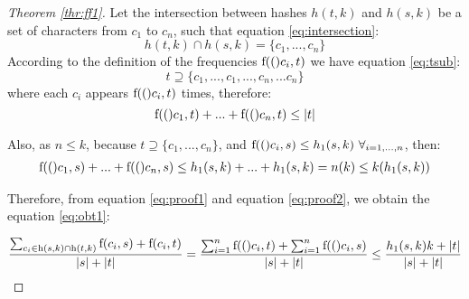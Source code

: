 
\begin{proof}[Theorem \ref{thr:ff1}]
	Let the intersection between hashes $h(t,k)$ and $h(s,k)$ be a set of characters from $c_1$ to $c_n$, such that equation \ref{eq:intersection}: 
	\begin{equation} \label{eq:intersection}
	h(t,k) \cap h(s,k)=\{c_1,...,c_n\}
	\end{equation}
	According to the definition of the frequencies $\textnormal{f}(()c_i, t)$ we have equation \ref{eq:tsub}: 
	\begin{equation} \label{eq:tsub}
	t \supseteq \{c_1,...,c_1,...,c_n,...c_n\}
	\end{equation}
	where each $c_i$ appears $\textnormal{f}(()c_i,t)$ times,  
	therefore: 
	\begin{equation} \label{eq:proof1}
	\textnormal{f}(()c_1,t) + ... + \textnormal{f}(()c_n, t) \leq |t|
	\end{equation}
	
	\noindent	Also, as $n \leq k$, because $t \supseteq \{c_1,...,c_n\}$, and $\textnormal{f}(()c_i,s) \leq h_1(s,k)~ \forall_ {i=1,...,n}$, then: 
	\begin{equation} \label{eq:proof2}
	\begin{split}
	\textnormal{f}(()c_1,s) + ... + \textnormal{f}(()c_n,s) \leq h_1(s,k) + ... + h_1(s,k)
	=n (k) \leq k (h_1(s,k))
	\end{split}
	\end{equation}
	
	Therefore, from equation \ref{eq:proof1} and equation \ref{eq:proof2}, we obtain the equation \ref{eq:obt1}:
	
	\begin{equation} \label{eq:obt1}
	\begin{split}
	\frac
	{\sum_{c_i \in \textnormal{h}(s,k) \cap \textnormal{h}(t,k)} \textnormal{f}(c_i,s)+\textnormal{f}(c_i,t)}
	{|s|+|t|}
	=\frac
	{\sum_{i=1}^n \textnormal{f}(()c_i,t) + \sum_{i=1}^n \textnormal{f}(()c_i,s)}
	{|s|+|t|}
	\leq \frac{h_1(s,k) k + |t|}{|s| + |t|} 
	\end{split}
	\end{equation}



\end{proof}
